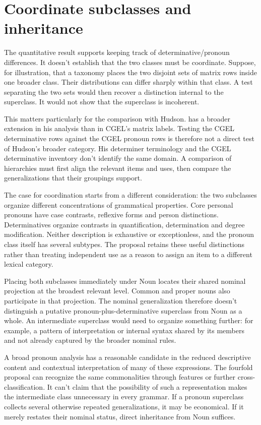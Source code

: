 \documentclass[12pt]{article}
\begin{document}
\section{Coordinate subclasses and inheritance}\label{sec:inheritance}

The quantitative result supports keeping track of determinative/pronoun differences. It doesn't establish that the two classes must be coordinate. Suppose, for illustration, that a taxonomy places the two disjoint sets of matrix rows inside one broader class. Their distributions can differ sharply within that class. A test separating the two sets would then recover a distinction internal to the superclass. It would not show that the superclass is incoherent.

This matters particularly for the comparison with Hudson.  has a broader extension in his analysis than in CGEL's matrix labels. Testing the CGEL determinative rows against the CGEL pronoun rows is therefore not a direct test of Hudson's broader category. His determiner terminology and the CGEL determinative inventory don't identify the same domain. A comparison of hierarchies must first align the relevant items and uses, then compare the generalizations that their groupings support.

The case for coordination starts from a different consideration: the two subclasses organize different concentrations of grammatical properties. Core personal pronouns have case contrasts, reflexive forms and person distinctions. Determinatives organize contrasts in quantification, determination and degree modification. Neither description is exhaustive or exceptionless, and the pronoun class itself has several subtypes. The proposal retains these useful distinctions rather than treating independent use as a reason to assign an item to a different lexical category.

Placing both subclasses immediately under Noun locates their shared nominal projection at the broadest relevant level. Common and proper nouns also participate in that projection. The nominal generalization therefore doesn't distinguish a putative pronoun-plus-determinative superclass from Noun as a whole. An intermediate superclass would need to organize something further: for example, a pattern of interpretation or internal syntax shared by its members and not already captured by the broader nominal rules.

A broad pronoun analysis has a reasonable candidate in the reduced descriptive content and contextual interpretation of many of these expressions. The fourfold proposal can recognize the same commonalities through features or further cross-classification. It can't claim that the possibility of such a representation makes the intermediate class unnecessary in every grammar. If a pronoun superclass collects several otherwise repeated generalizations, it may be economical. If it merely restates their nominal status, direct inheritance from Noun suffices.
\end{document}
